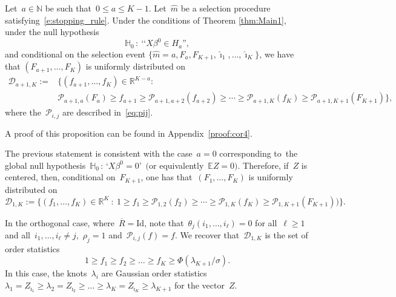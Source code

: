 \documentclass[final,numbib]{imaiai}%
\numberwithin{equation}{section}
\def\eq{\begin{equation}}
\def\qe{\end{equation}}
\def\cD{\mathcal{D}}
\def\cP{\mathcal{P}}
\def\bbE{\mathds{E}}
\def\bbN{\mathds{N}}
\def\bbR{\mathds{R}}
\renewcommand{\bar}{\overline}
\renewcommand{\hat}{\widehat}
\def\\bUnif{\text{\bUnif}}
\newcommand{\<}{\langle}
\renewcommand{\>}{\rangle}
\newcommand{\1}{\mathds{1}}
\begin{document}
{ 
\begin{proposition}%
\label{cor:Main1}
Let~$a\in\bbN$ be such that~$0\leq a\leq K-1$.
Let~$\hat m$ be a selection procedure satisfying~\eqref{e:stopping_rule}.
Under the conditions of Theorem \ref{thm:Main1}, under the null hypothesis 
\eq
\label{e:H0}
\mathds H_0\,:\ \text{‘‘}X\beta^0\in H_{a}\text{''},
\qe
and conditional on the selection event 
$\big\{\hat m=a, F_{a},F_{K+1},\hat \imath_1,\ldots, \hat \imath_K\big\}$, we have that $(F_{a+1},\ldots,F_K)$ is uniformly distributed on 
\begin{align*}
\cD_{a+1,K}:=&
\big\{
(f_{a+1},\ldots,f_K)\in\bbR^{K-a}:\ \\
&\cP_{a+1,a}(F_{a})\geq f_{a+1}\geq \cP_{a+1,a+2}(f_{a+2})%
\geq \cdots
\geq \cP_{a+1,K}(f_K)\geq \cP_{a+1,K+1}(F_{K+1})
\big\},
\end{align*}
where the~$\cP_{i,j}$ are described in~\eqref{eq:pij}.
\end{proposition}
\noindent
A proof of this proposition can be found in Appendix~\ref{proof:cor4}.


\begin{remark}
The previous statement is consistent with the case~$a=0$ corresponding to~the {\rm global null} hypothesis~$\mathds H_0\,:\, \text{`}X\beta^0=0\text{'}$~$($or equivalently~$\bbE Z=0)$.
Therefore, if~$Z$ is centered, then, conditional on~$F_{K+1}$, one has that~$(F_1,\ldots,F_K)$ is uniformly distributed on 
\[
\cD_{1,K}:=
\big\{
(f_1,\ldots,f_K)\in\bbR^K\ :\ 
1\geq f_1\geq \cP_{1,2}(f_2)\geq \cdots\geq \cP_{1,K}(f_K)\geq \cP_{1,K+1}(F_{K+1}))
\big\}.
\]
\end{remark}

\begin{remark}
\label{rem:stat_order}
In the orthogonal case, where~$\bar R=\mathrm{Id}$, note that~$\theta_j(i_1,\ldots,i_\ell)=0$ for all~$\ell\geq1$ and all~$i_1,\ldots,i_\ell\neq j$,~$\rho_j=1$ and~$\cP_{i,j}(f)=f$.
We recover that~$\cD_{1,K}$ is the set of order statistics~
\[
1\geq f_1\geq f_2\geq\ldots\geq f_K\geq  \Phi(\lambda_{K+1}/\sigma).
\] 
In this case, the knots~$\lambda_i$ are Gaussian order statistics~$\lambda_1=Z_{\hat \imath_1}\geq \lambda_2=Z_{\hat \imath_2}\geq \ldots\geq \lambda_K=Z_{\hat \imath_K}\geq \lambda_{K+1}$ for the vector~$Z$.
\end{remark}

}
\end{document}

